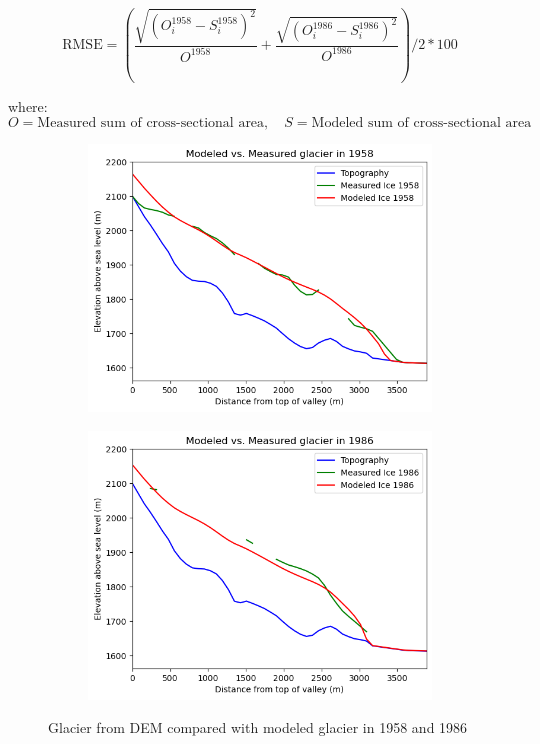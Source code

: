 \documentclass{article}
\begin{document}
\begin{equation}
    \mathrm{RMSE} = \left(\frac{\sqrt{\left( O^{1958}_i - S^{1958}_i \right)^2}}{{O^{1958}}}+\frac{\sqrt{ \left( O^{1986}_i - S^{1986}_i \right)^2}}{{O^{1986}}} \right)/2*100
\end{equation}

\noindent where:
$$O = \text{Measured sum of cross-sectional area}, \quad S=\text{Modeled sum of cross-sectional area}$$

\begin{figure}[h]
    \centering
    \begin{subfigure}[b]{0.49\textwidth}
        \centering
        \includegraphics[width=\textwidth]{Plots/1958_glacier_comparison.png}
        \label{fig:1958_glacier_comparison}
    \end{subfigure}
    \hfill
    \begin{subfigure}[b]{0.49\textwidth}
        \centering
        \includegraphics[width=\textwidth]{Plots/1986_glacier_comparison.png}
        \label{fig:v}
    \end{subfigure}
    \caption{Glacier from DEM compared with modeled glacier in 1958 and 1986}
    \label{fig:1986_glacier_comparison}
\end{figure}
\FloatBarrier
\end{document}
